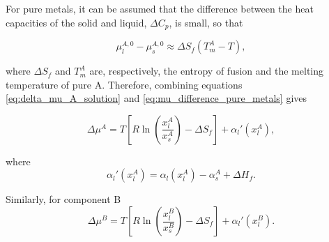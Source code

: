 For pure metals, it can be assumed that the difference between the heat capacities of the solid and liquid, \(\Delta C_p\), is small, so that

\begin{equation}
\mu_l^{A,0} - \mu_s^{A,0} \approx \Delta S_f (T_m^A - T), \label{eq:mu_difference_pure_metals}
\end{equation}

where \(\Delta S_f\) and \(T_m^A\) are, respectively, the entropy of fusion and the melting temperature of pure A. Therefore, combining equations \eqref{eq:delta_mu_A_solution} and \eqref{eq:mu_difference_pure_metals} gives

\begin{equation}
\Delta \mu^A = T \left[ R \ln\left(\frac{x_l^A}{x_s^A}\right) - \Delta S_f \right] + \alpha_l'(x_l^A), \label{eq:combined_delta_mu_A}
\end{equation}

where
\begin{equation}
\alpha_l'(x_l^A) = \alpha_l(x_l^A) - \alpha_s^A + \Delta H_f. \label{eq:alpha_prime_A}
\end{equation}

Similarly, for component B
\begin{equation}
\Delta \mu^B = T \left[ R \ln\left(\frac{x_l^B}{x_s^B}\right) - \Delta S_f \right] + \alpha_l'(x_l^B). \label{eq:delta_mu_B_solution}
\end{equation}

